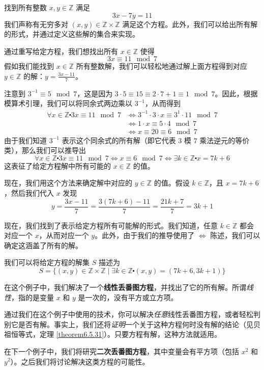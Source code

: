 \begin{example}\label{ex:example6.5.26}
    找到所有整数 $x, y \in \mathbb{Z}$ 满足
    \[3x - 7y = 11\]
    我们声称有无穷多对 $(x, y) \in \mathbb{Z} \times \mathbb{Z}$ 满足这个方程。此外，我们可以给出所有解的形式，并通过定义这些解的集合来实现。

    通过重写给定方程，我们想找出所有 $x \in \mathbb{Z}$ 使得
    \[3x \equiv 11 \mod 7\]
    假如我们能找到 $x \in \mathbb{Z}$ 所有整数解，我们可以轻松地通过解上面方程得到对应 $y \in \mathbb{Z}$ 的解：$y = \frac{3x-11}{7}$。

    注意到 $3^{-1} \equiv 5 \mod 7$，这是因为 $3 \cdot 5 \equiv 15 \equiv 2 \cdot 7 + 1 \equiv 1 \mod 7$。因此，根据模算术引理，我们可以将同余式两边乘以 $3^{-1}$，从而得到
    \begin{align*}
        \forall x \in \mathbb{Z} \centerdot 3x \equiv 11 \mod 7 &\iff 3^{-1} \cdot 3 \cdot x \equiv 3^{1}
\cdot 11 \mod 7 \\
        &\iff 1 \cdot x \equiv 5 \cdot 4 \mod 7 \\
        &\iff x \equiv 20 \equiv 6 \mod 7
    \end{align*}
    由于我们知道 $3^{-1}$ 表示这个同余式的所有解（即它代表 $3$ 模 $7$ 乘法逆元的等价类），那么我们可以推导出
    \[\forall x \in \mathbb{Z} \centerdot 3x \equiv 11 \mod 7 \iff x \equiv 6 \mod 7 \iff \exists k \in \mathbb{Z} \centerdot x = 7k + 6\]
    这表征了给定方程解中所有可能的 $x \in \mathbb{Z}$ 的值。

    现在，我们用这个方法来确定解中对应的 $y \in \mathbb{Z}$ 的值。假设 $k \in \mathbb{Z}$，且 $x = 7k + 6$，然后我们代入 $x$ 发现
    \[y = \frac{3x-11}{7} = \frac{3(7k + 6)-11}{7} = \frac{21k+7}{7} = 3k+1\]

    现在，我们找到了表示给定方程所有可能解的形式。我们知道，任意 $k \in \mathbb{Z}$ 都会对应一个 $x$，从而对应一个 $y$。此外，由于我们的推导使用了 $\iff$ 陈述，我们可以确定这涵盖了所有的解。

    我们可以将给定方程的解集 $S$ 描述为
    \[S = \{(x, y) \in \mathbb{Z} \times \mathbb{Z} \mid \exists k \in \mathbb{Z} \centerdot (x, y) = (7k + 6, 3k + 1)\}\]
\end{example}

\begin{tcolorbox}[colback=gray!10,
    colframe=black,
    width=\textwidth,
    arc=2mm, auto outer arc,
    title={有趣的事实},breakable,enhanced jigsaw,
    before upper={\parindent15pt\noindent},	]
    在这个例子中，我们解决了一个\textbf{线性丢番图方程}，并找出了它的所有解。所谓\emph{线性}，指的是变量 $x$ 和 $y$ 是一次的，没有平方或立方项。

    通过我们在这个例子中使用的技术，你可以解决\emph{任意}线性丢番图方程，或者轻松判别它是否有解。事实上，我们还将\emph{证明}一个关于这种方程何时没有解的结论（见贝祖恒等式，定理 \ref{theorem6.5.31}）。只要方程有解，这种方法就适用。
    
    在下一个例子中，我们将研究\textbf{二次丢番图方程}，其中变量会有平方项（包括 $x^2$ 和 $y^2$）。之后我们将讨论解决这类方程的可能性。
\end{tcolorbox}

